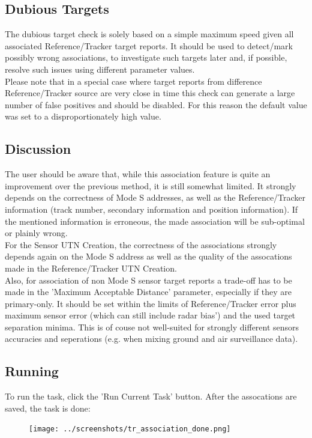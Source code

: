 \subsection{Dubious Targets}

The dubious target check is solely based on a simple maximum speed given all associated Reference/Tracker target reports. It should be used to detect/mark possibly wrong associations, to investigate such targets later and, if possible, resolve such issues using different parameter values. \\

Please note that in a special case where target reports from difference Reference/Tracker source are very close in time this check can generate a large number of false positives and should be disabled. For this reason the default value was set to a disproportionately high value.

\subsection{Discussion}

The user should be aware that, while this association feature is quite an improvement over the previous method, it is still somewhat limited. It strongly depends on the correctness of Mode S addresses, as well as the Reference/Tracker information (track number, secondary information and position information). If the mentioned information is erroneous, the made association will be sub-optimal or plainly wrong. \\

For the Sensor UTN Creation, the correctness of the associations strongly depends again on the Mode S address as well as the quality of the assocations made in the Reference/Tracker UTN Creation. \\

Also, for association of non Mode S sensor target reports a trade-off has to be made in the 'Maximum Acceptable Distance' parameter, especially if they are primary-only. It should be set within the limits of Reference/Tracker error plus maximum sensor error (which can still include radar bias') and the used target separation minima. This is of couse not well-suited for strongly different sensors accuracies and seperations (e.g. when mixing ground and air surveillance data). \\

\subsection{Running}

To run the task, click the 'Run Current Task' button. After the assocations are saved, the task is done:

\begin{figure}[H]
  \center
    \texttt{[image: ../screenshots/tr\_association\_done.png]}
\end{figure}
